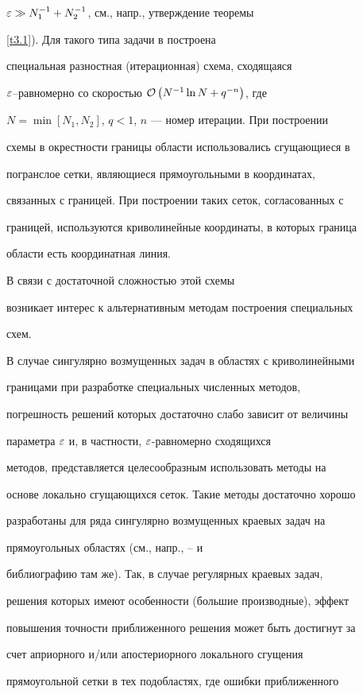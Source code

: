 $\varepsilon\gg N_1^{-1}+N_2^{-1}$, см., напр., утверждение теоремы


\ref{t3.1}). Для такого типа задачи в \cite{1} построена


специальная разностная (итерационная) схема, сходящаяся


$\varepsilon$--равномерно со скоростью ${\cal O} \left(N^{-1}\ln N+q^{-n}\right)$, где


$N=\min[N_1,N_2]$, $q<1$, $n$ --- номер итерации. При построении


схемы в окрестности границы области использовались сгущающиеся в


погранслое сетки, являющиеся прямоугольными в координатах,


связанных с границей. При построении таких сеток, согласованных с


границей, используются криволинейные координаты, в которых граница


области есть координатная линия.


 В связи с достаточной сложностью этой схемы


возникает интерес к альтернативным методам построения специальных


схем.





В случае сингулярно возмущенных задач в областях с криволинейными


границами при разработке специальных численных методов,


погрешность решений которых достаточно слабо зависит от величины


параметра $\varepsilon$ и, в частности, $\varepsilon$-равномерно сходящихся


методов, представляется целесообразным использовать методы на


основе локально сгущающихся сеток. Такие методы достаточно хорошо


разработаны для ряда сингулярно возмущенных краевых задач на


прямоугольных областях (см., напр., \cite{1}--\cite{4} и


библиографию там же). Так, в случае регулярных краевых задач,


решения которых имеют особенности (большие производные), эффект


повышения точности приближенного решения может быть достигнут за


счет априорного и/или апостериорного локального сгущения


прямоугольной сетки в тех подобластях, где ошибки приближенного


